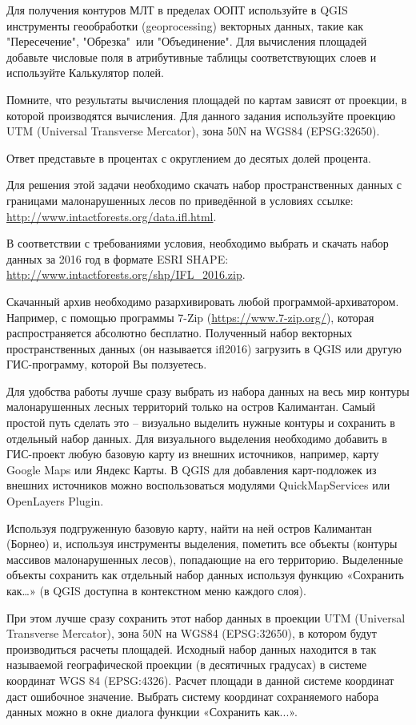 Для получения контуров МЛТ в пределах ООПТ используйте в QGIS  инструменты геообработки (geoprocessing) векторных данных, такие как "Пересечение"{}, "Обрезка"\ или "Объединение". Для вычисления площадей добавьте числовые поля в атрибутивные таблицы соответствующих слоев и используйте Калькулятор полей.

Помните, что результаты вычисления площадей по картам зависят от проекции, в которой производятся вычисления. Для данного задания используйте проекцию UTM (Universal Transverse Mercator), зона 50N на WGS84 (EPSG:32650).

Ответ представьте в процентах с округлением до десятых долей процента.

\explanationSection

Для решения этой задачи необходимо скачать набор пространственных данных с границами малонарушенных лесов по приведённой в условиях ссылке: \url{http://www.intactforests.org/data.ifl.html}.

В соответствии с требованиями условия, необходимо выбрать и скачать набор данных за 2016 год в формате ESRI SHAPE: \url{http://www.intactforests.org/shp/IFL_2016.zip}.

Скачанный архив необходимо разархивировать любой программой-архиватором. Например, с помощью программы 7-Zip (\url{https://www.7-zip.org/}), которая распространяется абсолютно бесплатно. Полученный набор векторных пространственных данных (он называется ifl2016) загрузить в QGIS или другую ГИС-программу, которой Вы ползуетесь.

Для удобства работы лучше сразу выбрать из набора данных на весь мир контуры малонарушенных лесных территорий только на остров Калимантан. Самый простой путь сделать это – визуально выделить нужные контуры и сохранить в отдельный набор данных. Для визуального выделения необходимо добавить в ГИС-проект любую базовую карту из внешних источников, например, карту Google Maps или Яндекс Карты. В QGIS для добавления карт-подложек из внешних источников можно воспользоваться модулями QuickMapServices или OpenLayers Plugin.

Используя подгруженную базовую карту, найти на ней остров Калимантан (Борнео) и, используя инструменты выделения, пометить все объекты (контуры массивов малонарушенных лесов), попадающие на его территорию. Выделенные объекты сохранить как отдельный набор данных используя функцию «Сохранить как…» (в QGIS доступна в контекстном меню каждого слоя).

При этом лучше сразу сохранить этот набор данных в проекции UTM (Universal Transverse Mercator), зона 50N на WGS84 (EPSG:32650), в котором будут производиться расчеты площадей. Исходный набор данных находится в так называемой географической проекции (в десятичных градусах) в системе координат WGS 84 (EPSG:4326). Расчет площади в данной системе координат даст ошибочное значение. Выбрать систему координат сохраняемого набора данных можно в окне диалога функции «Сохранить как...».

